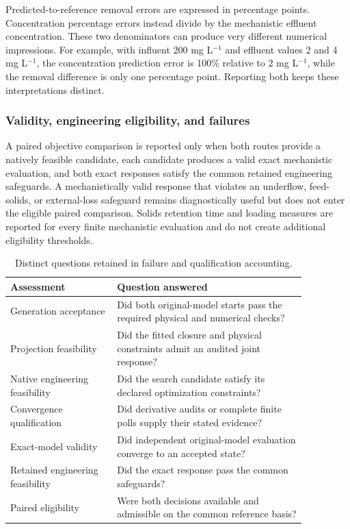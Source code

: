 Predicted-to-reference removal errors are expressed in percentage points. Concentration percentage errors instead divide by the mechanistic effluent concentration. These two denominators can produce very different numerical impressions. For example, with influent 200 mg L$^{-1}$ and effluent values 2 and 4 mg L$^{-1}$, the concentration prediction error is 100\% relative to 2 mg L$^{-1}$, while the removal difference is only one percentage point. Reporting both keeps these interpretations distinct.

\subsubsection{Validity, engineering eligibility, and failures}

A paired objective comparison is reported only when both routes provide a natively feasible candidate, each candidate produces a valid exact mechanistic evaluation, and both exact responses satisfy the common retained engineering safeguards. A mechanistically valid response that violates an underflow, feed-solids, or external-loss safeguard remains diagnostically useful but does not enter the eligible paired comparison. Solids retention time and loading measures are reported for every finite mechanistic evaluation and do not create additional eligibility thresholds.

\begin{table}[htbp]
\centering\small
\caption{Distinct questions retained in failure and qualification accounting.}
\label{tab:plant_failure_classes}
\begin{tabular}{p{0.31\linewidth}p{0.55\linewidth}}
\toprule Assessment & Question answered\\\midrule
Generation acceptance & Did both original-model starts pass the required physical and numerical checks?\\
Projection feasibility & Did the fitted closure and physical constraints admit an audited joint response?\\
Native engineering feasibility & Did the search candidate satisfy its declared optimization constraints?\\
Convergence qualification & Did derivative audits or complete finite polls supply their stated evidence?\\
Exact-model validity & Did independent original-model evaluation converge to an accepted state?\\
Retained engineering feasibility & Did the exact response pass the common safeguards?\\
Paired eligibility & Were both decisions available and admissible on the common reference basis?\\
\bottomrule
\end{tabular}
\end{table}

